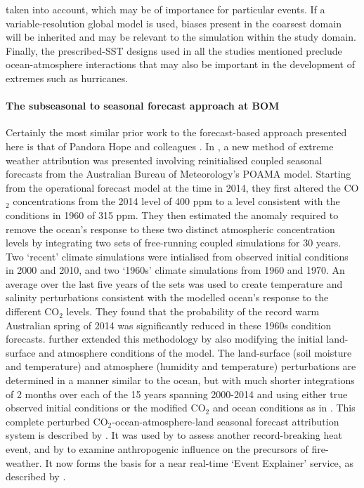 taken into account, which may be of importance for particular events. If a variable-resolution global model is used, biases present in the coarsest domain will be inherited and may be relevant to the simulation within the study domain. Finally, the prescribed-SST designs used in all the studies mentioned preclude ocean-atmosphere interactions that may also be important in the development of extremes such as hurricanes.

  \paragraph*{The subseasonal to seasonal forecast approach at BOM}

    Certainly the most similar prior work to the forecast-based approach presented here is that of Pandora Hope and colleagues \citep{hope_contributors_2015,hope_what_2016,hope_determining_2019,hope_subseasonal_2022,wang_initialized_2021}. In \citet{hope_contributors_2015}, a new method of extreme weather attribution was presented involving reinitialised coupled seasonal forecasts from the Australian Bureau of Meteorology's POAMA model. Starting from the operational forecast model at the time in 2014, they first altered the CO$_2$ concentrations from the 2014 level of 400 ppm to a level consistent with the conditions in 1960 of 315 ppm. They then estimated the anomaly required to remove the ocean's response to these two distinct atmospheric concentration levels by integrating two sets of free-running coupled simulations for 30 years. Two `recent' climate simulations were intialised from observed initial conditions in 2000 and 2010, and two `1960s' climate simulations from 1960 and 1970. An average over the last five years of the sets was used to create temperature and salinity perturbations consistent with the modelled ocean's response to the different CO$_2$ levels. They found that the probability of the record warm Australian spring of 2014 was significantly reduced in these 1960s condition forecasts. \citet{hope_what_2016} further extended this methodology by also modifying the initial land-surface and atmosphere conditions of the model. The land-surface (soil moisture and temperature) and atmosphere (humidity and temperature) perturbations are determined in a manner similar to the ocean, but with much shorter integrations of 2 months over each of the 15 years spanning 2000-2014 and using either true observed initial conditions or the modified CO$_2$ and ocean conditions as in \citet{hope_contributors_2015}. This complete perturbed CO$_2$-ocean-atmosphere-land seasonal forecast attribution system is described by \citet{wang_initialized_2021}. It was used by \citet{hope_what_2016} to assess another record-breaking heat event, and by \citet{hope_determining_2019} to examine anthropogenic influence on the precursors of fire-weather. It now forms the basis for a near real-time `Event Explainer' service, as described by \citet{hope_subseasonal_2022}.

